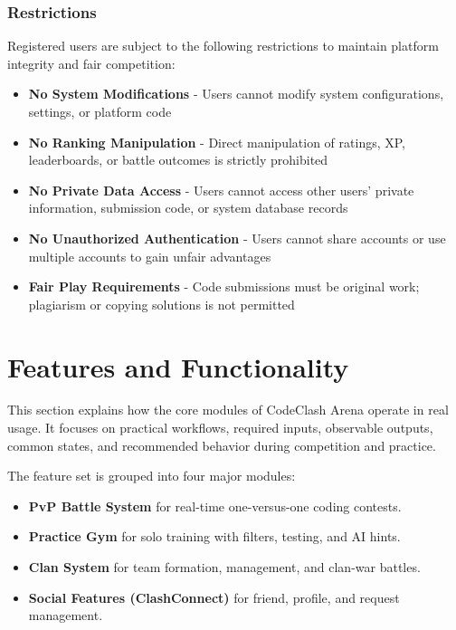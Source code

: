 \documentclass[12pt]{article}
\begin{document}
\clearpage
\subsubsection{Restrictions}

Registered users are subject to the following restrictions to maintain platform integrity and fair competition:

\begin{itemize}
\item \textbf{No System Modifications} - Users cannot modify system configurations, settings, or platform code

\item \textbf{No Ranking Manipulation} - Direct manipulation of ratings, XP, leaderboards, or battle outcomes is strictly prohibited

\item \textbf{No Private Data Access} - Users cannot access other users' private information, submission code, or system database records

\item \textbf{No Unauthorized Authentication} - Users cannot share accounts or use multiple accounts to gain unfair advantages

\item \textbf{Fair Play Requirements} - Code submissions must be original work; plagiarism or copying solutions is not permitted
\end{itemize}
\newpage


\section{Features and Functionality}

This section explains how the core modules of CodeClash Arena operate in real usage. It focuses on practical workflows, required inputs, observable outputs, common states, and recommended behavior during competition and practice.

The feature set is grouped into four major modules:
\begin{itemize}
\item \textbf{PvP Battle System} for real-time one-versus-one coding contests.
\item \textbf{Practice Gym} for solo training with filters, testing, and AI hints.
\item \textbf{Clan System} for team formation, management, and clan-war battles.
\item \textbf{Social Features (ClashConnect)} for friend, profile, and request management.
\end{itemize}
\end{document}
